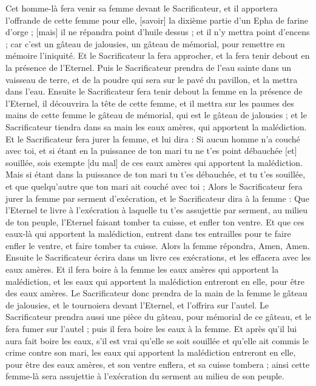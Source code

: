 \begin{multicols}{2}
Cet homme-là fera venir sa femme devant le Sacrificateur, et il apportera l'offrande de cette femme pour elle, [savoir] la dixième partie d'un Epha de farine d'orge ; [mais] il ne répandra point d'huile dessus ; et il n'y mettra point d'encens ; car c'est un gâteau de jalousies, un gâteau de mémorial, pour remettre en mémoire l'iniquité.
Et le Sacrificateur la fera approcher, et la fera tenir debout en la présence de l'Eternel.
Puis le Sacrificateur prendra de l'eau sainte dans un vaisseau de terre, et de la poudre qui sera sur le pavé du pavillon, et la mettra dans l'eau.
Ensuite le Sacrificateur fera tenir debout la femme en la présence de l'Eternel, il découvrira la tête de cette femme, et il mettra sur les paumes des mains de cette femme le gâteau de mémorial, qui est le gâteau de jalousies ; et le Sacrificateur tiendra dans sa main les eaux amères, qui apportent la malédiction.
Et le Sacrificateur fera jurer la femme, et lui dira : Si aucun homme n'a couché avec toi, et si étant en la puissance de ton mari tu ne t'es point débauchée [et] souillée, sois exempte [du mal] de ces eaux amères qui apportent la malédiction.
Mais si étant dans la puissance de ton mari tu t'es débauchée, et tu t'es souillée, et que quelqu'autre que ton mari ait couché avec toi ;
Alors le Sacrificateur fera jurer la femme par serment d'exécration, et le Sacrificateur dira à la femme : Que l'Eternel te livre à l'exécration à laquelle tu t'es assujettie par serment, au milieu de ton peuple, l'Eternel faisant tomber ta cuisse, et enfler ton ventre.
Et que ces eaux-là qui apportent la malédiction, entrent dans tes entrailles pour te faire enfler le ventre, et faire tomber ta cuisse. Alors la femme répondra, Amen, Amen.
Ensuite le Sacrificateur écrira dans un livre ces exécrations, et les effacera avec les eaux amères.
Et il fera boire à la femme les eaux amères qui apportent la malédiction, et les eaux qui apportent la malédiction entreront en elle, pour être des eaux amères.
Le Sacrificateur donc prendra de la main de la femme le gâteau de jalousies, et le tournoiera devant l'Eternel, et l'offrira sur l'autel.
Le Sacrificateur prendra aussi une pièce du gâteau, pour mémorial de ce gâteau, et le fera fumer sur l'autel ; puis il fera boire les eaux à la femme.
Et après qu'il lui aura fait boire les eaux, s'il est vrai qu'elle se soit souillée et qu'elle ait commis le crime contre son mari, les eaux qui apportent la malédiction entreront en elle, pour être des eaux amères, et son ventre enflera, et sa cuisse tombera ; ainsi cette femme-là sera assujettie à l'exécration du serment au milieu de son peuple.

\end{multicols}

